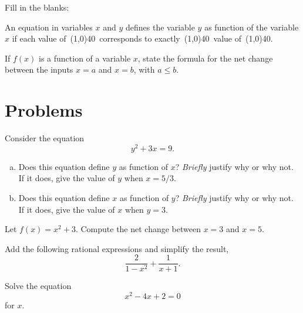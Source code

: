 \documentclass[12pt]{amsart}
\begin{document}
\begin{thm}[3 Points]\label{ex5}
  Fill in the blanks:\\
  \begin{center}
    An equation in variables $x$ and $y$ defines the variable $y$ as function of the variable $x$ if each value of\ \line(1,0){40}\ corresponds to exactly\ \line(1,0){40}\ value of\ \line(1,0){40}.
  \end{center}
  \vspace{1in}
\end{thm}

\begin{thm}[3 Points]\label{ex6}
  If $f(x)$ is a function of a variable $x$, state the formula for the net change between the inputs $x = a$ and $x = b$, with $a \leq b$.
\end{thm}

\newpage
\section{Problems}
\begin{thm}[16 Points]\label{ex7}
  Consider the equation
  $$y^2 + 3x = 9.$$
  \begin{enumerate}[(a)]
    \item
      Does this equation define $y$ as function of $x$?  
      {\it Briefly} justify why or why not.
      If it does, give the value of $y$ when $x = 5/3$.
      \vspace{2in}
    \item
      Does this equation define $x$ as function of $y$?  {\it Briefly} justify why or why not.
      If it does, give the value of $x$ when $y = 3$.
      \vspace{2in}
  \end{enumerate}
\end{thm}

\begin{thm}[16 Points]\label{ex8}
  Let $f(x) = x^2 + 3$.  Compute the net change between $x = 3$ and $x = 5$.
\end{thm}

\newpage

\begin{thm}[16 Points]\label{ex9}
  Add the following rational expressions and simplify the result,
  $$\frac{2}{1 - x^2} + \frac{1}{x+1}.$$
\end{thm}

\newpage

\begin{thm}[16 Points]\label{ex10}
  Solve the equation
  $$x^2 - 4x + 2 = 0$$
  for $x$.
  \vspace{3in}
\end{thm}
\end{document}
